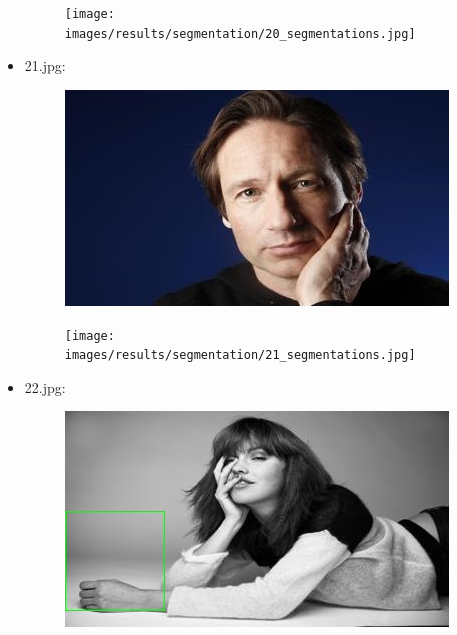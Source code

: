 \begin{itemize}
\begin{figure}[!htb]
\begin{minipage}{0.5\textwidth}
            \end{minipage}\hfill
            \begin{minipage}{0.5\textwidth}
                \centering
                \texttt{[image: images/results/segmentation/20\_segmentations.jpg]}
            \end{minipage}
        \end{figure}
    \newpage
    \item 21.jpg:
        \begin{figure}[!htb]
            \begin{minipage}{0.5\textwidth}
                \centering
                \includegraphics[scale = 0.68]{images/results/detection/21_detections.jpg}
            \end{minipage}\hfill
            \begin{minipage}{0.5\textwidth}
                \centering
                \texttt{[image: images/results/segmentation/21\_segmentations.jpg]}
            \end{minipage}
        \end{figure}
    \item 22.jpg:
        \begin{figure}[!htb]
            \begin{minipage}{0.5\textwidth}
                \centering
                \includegraphics[scale = 0.68]{images/results/detection/22_detections.jpg}
            \end{minipage}\hfill

\end{figure}
\end{itemize}
